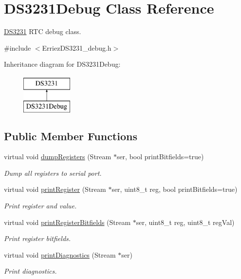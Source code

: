 \hypertarget{class_d_s3231_debug}{}\section{D\+S3231\+Debug Class Reference}
\label{class_d_s3231_debug}


\hyperlink{class_d_s3231}{D\+S3231} R\+TC debug class.  




{\ttfamily \#include $<$Erriez\+D\+S3231\+\_\+debug.\+h$>$}

Inheritance diagram for D\+S3231\+Debug\+:\begin{figure}[H]
\begin{center}
\leavevmode
\includegraphics[height=2.000000cm]{class_d_s3231_debug}
\end{center}
\end{figure}
\subsection*{Public Member Functions}
\begin{DoxyCompactItemize}
\item 
virtual void \hyperlink{class_d_s3231_debug_a26f0361e7f1462b1424bb2bb189af240}{dump\+Registers} (Stream $\ast$ser, bool print\+Bitfields=true)
\begin{DoxyCompactList}\small\item\em Dump all registers to serial port. \end{DoxyCompactList}\item 
virtual void \hyperlink{class_d_s3231_debug_a1e95a14a76374cf459d5e4ccbdb6286e}{print\+Register} (Stream $\ast$ser, uint8\+\_\+t reg, bool print\+Bitfields=true)
\begin{DoxyCompactList}\small\item\em Print register and value. \end{DoxyCompactList}\item 
virtual void \hyperlink{class_d_s3231_debug_ac739b6f1980b8254e57b6966ab1dcc97}{print\+Register\+Bitfields} (Stream $\ast$ser, uint8\+\_\+t reg, uint8\+\_\+t reg\+Val)
\begin{DoxyCompactList}\small\item\em Print register bitfields. \end{DoxyCompactList}\item 
virtual void \hyperlink{class_d_s3231_debug_ae9b7944902fc05ea5dcb608c75564f6a}{print\+Diagnostics} (Stream $\ast$ser)
\begin{DoxyCompactList}\small\item\em Print diagnostics. \end{DoxyCompactList}\end{DoxyCompactItemize}


